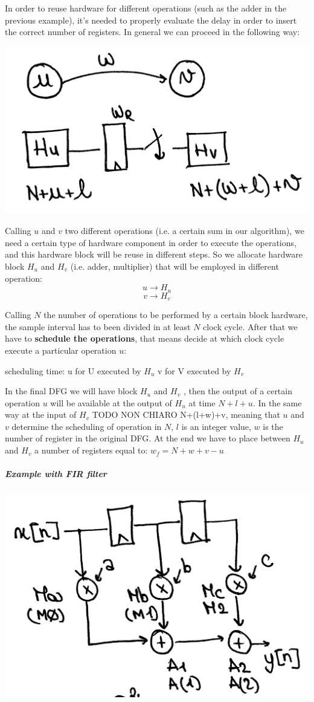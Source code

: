In order to reuse hardware for different operations (such as the adder in the previous example), it's needed to properly evaluate the delay in order to insert the correct number of registers. In general we can proceed in the following way:

\begin{center}
  \includegraphics[width=0.6\linewidth]{img/img1/32}
\end{center}
Calling $u$ and $v$ two different operations (i.e. a certain sum in our algorithm), we need a certain type of hardware component in order to execute the operations, and this hardware block will be reuse in different steps. So we allocate hardware block $H_u$ and $H_v$ (i.e. adder, multiplier) that will be employed in different operation:
$$u \longrightarrow H_u$$
$$v \longrightarrow H_v$$

Calling $N$ the number of operations to be performed by a certain block hardware, the sample interval has to been divided in at least $N$ clock cycle. After that we have to \textbf{schedule the operations}, that means decide at which clock cycle execute a particular operation $u$:

scheduling time: u for U executed by $H_u$
v for V executed by $H_v$

In the final DFG we will have block $H_u$ and  $H_v$ , then the output of a certain operation $u$ will be available at the output of $H_u$ at time $N+l+u$. In the same way at the input of $H_v$ TODO NON CHIARO N+(l+w)+v, meaning that $u$ and $v$ determine the scheduling of operation in $N$, $l$ is an integer value, $w$ is the number of register in the original DFG. At the end we have to place between $H_u$ and $H_v$ a number of registers equal to:
$w_f=N+w+v-u$

\subparagraph{Example with FIR filter}

\begin{center}
  \includegraphics[width=0.6\linewidth]{img/img1/33}
\end{center}

